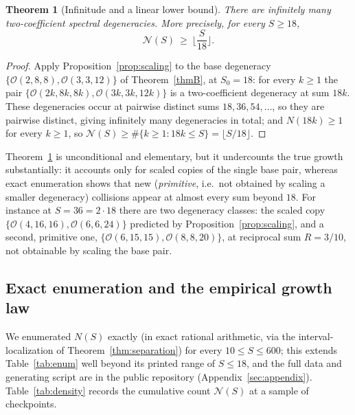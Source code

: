 \documentclass[12pt, letterpaper]{article}
\theoremstyle{definition}
\theoremstyle{plain}
\newtheorem{theorem}{Theorem}[section]
\begin{document}
\begin{theorem}[Infinitude and a linear lower bound]\label{thm:density-lower}
There are infinitely many two-coefficient spectral degeneracies. More precisely, for every $S\ge18$,
\[
    \mathcal N(S)\ \ge\ \Big\lfloor \frac S{18}\Big\rfloor.
\]
\end{theorem}
\begin{proof}
Apply Proposition~\ref{prop:scaling} to the base degeneracy $\{\mathcal O(2,8,8),\mathcal O(3,3,12)\}$ of Theorem~\ref{thmB}, at $S_0=18$: for every $k\ge1$ the pair $\{\mathcal O(2k,8k,8k),\mathcal O(3k,3k,12k)\}$ is a two-coefficient degeneracy at sum $18k$. These degeneracies occur at pairwise distinct sums $18,36,54,\dots$, so they are pairwise distinct, giving infinitely many degeneracies in total; and $N(18k)\ge1$ for every $k\ge1$, so $\mathcal N(S)\ge\#\{k\ge1: 18k\le S\}=\lfloor S/18\rfloor$.
\end{proof}

Theorem~\ref{thm:density-lower} is unconditional and elementary, but it undercounts the true growth substantially: it accounts only for scaled copies of the single base pair, whereas exact enumeration shows that new (\emph{primitive}, i.e.\ not obtained by scaling a smaller degeneracy) collisions appear at almost every sum beyond $18$. For instance at $S=36=2\cdot18$ there are two degeneracy classes: the scaled copy $\{\mathcal O(4,16,16),\mathcal O(6,6,24)\}$ predicted by Proposition~\ref{prop:scaling}, and a second, primitive one, $\{\mathcal O(6,15,15),\mathcal O(8,8,20)\}$, at reciprocal sum $R=3/10$, not obtainable by scaling the base pair.

\subsection{Exact enumeration and the empirical growth law}

We enumerated $N(S)$ exactly (in exact rational arithmetic, via the interval-localization of Theorem~\ref{thm:separation}) for every $10\le S\le600$; this extends Table~\ref{tab:enum} well beyond its printed range of $S\le18$, and the full data and generating script are in the public repository (Appendix~\ref{sec:appendix}). Table~\ref{tab:density} records the cumulative count $\mathcal N(S)$ at a sample of checkpoints.
\end{document}

